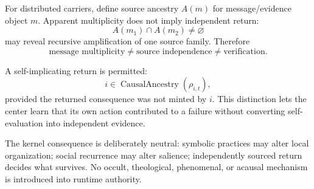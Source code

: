 \documentclass[10pt]{article}
\theoremstyle{venus}
\theoremstyle{definition}
\begin{document}
For distributed carriers, define source ancestry $A(m)$ for message/evidence
object $m$. Apparent multiplicity does not imply independent return:
\[
A(m_1)\cap A(m_2)\neq\varnothing
\]
may reveal recursive amplification of one source family. Therefore
\[
\boxed{\text{message multiplicity}\neq\text{source independence}
\neq\text{verification}.}
\]

A self-implicating return is permitted:
\[
i\in\operatorname{CausalAncestry}(\rho_{i,t}),
\]
provided the returned consequence was not minted by $i$. This distinction lets
the center learn that its own action contributed to a failure without converting
self-evaluation into independent evidence.

The kernel consequence is deliberately neutral: symbolic practices may alter
local organization; social recurrence may alter salience; independently sourced
return decides what survives. No occult, theological, phenomenal, or acausal
mechanism is introduced into runtime authority.
\end{document}
